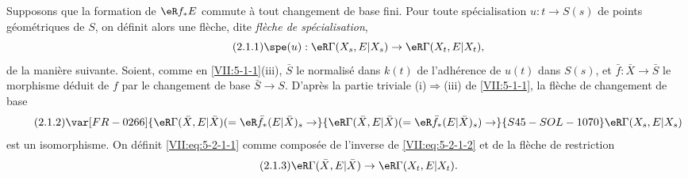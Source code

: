 Supposons que la formation de $\eR f_\ast E$ commute à tout changement de 
base fini. Pour toute spécialisation $u:t\to S(s)$ de points géométriques 
de $S$, on définit alors une flèche, dite \emph{flèche de 
spécialisation}, 
\begin{equation*}\tag{2.1.1}\label{VII:eq:5-2-1-1}
  \spe(u):\eR\Gamma(X_s,E|X_s) \to \eR\Gamma(X_t,E|X_t) \text{,}
\end{equation*}
de la manière suivante. Soient, comme en \ref{VII:5-1-1}(iii), $\bar S$ le 
normalisé dans $k(t)$ de l'adhérence de $u(t)$ dans $S(s)$, et 
$\bar f:\bar X\to \bar S$ le morphisme déduit de $f$ par le changement de 
base $\bar S\to S$. D'après la partie triviale (i)$\Rightarrow$(iii) de 
\ref{VII:5-1-1}, la flèche de changement de base
\begin{equation*}\tag{2.1.2}\label{VII:eq:5-2-1-2}
  \var[FR-0266]{\eR\Gamma(\bar X,E|\bar X) (=\eR\bar f_\ast (E|\bar X)_s \to}{\eR\Gamma(\bar X,E|\bar X) (=\eR\bar f_\ast (E|\bar X)_s) \to}{S45-SOL-1070} \eR\Gamma(X_s,E|X_s) 
\end{equation*}
est un isomorphisme. On définit \eqref{VII:eq:5-2-1-1} comme composée de 
l'inverse de \eqref{VII:eq:5-2-1-2} et de la flèche de restriction 
\begin{equation*}\tag{2.1.3}\label{VII:eq:5-2-1-3}
  \eR\Gamma(\bar X,E|\bar X) \to \eR\Gamma(X_t,E|X_t) \text{.}
\end{equation*}





\subsubsection{}\label{VII:5-2-2}

